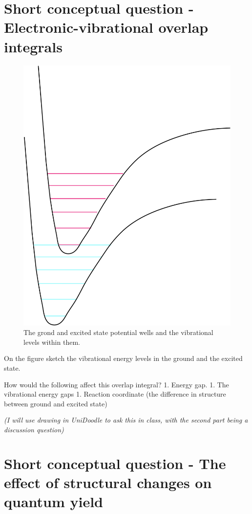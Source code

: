 \documentclass[
]{book}
\begin{document}
\hypertarget{sec:overlap}{%
\section{Short conceptual question - Electronic-vibrational overlap integrals}\label{sec:overlap}}

\begin{figure}

{\centering \includegraphics[width=0.7\linewidth]{images/overlap} 

}

\caption{The grond and excited state potential wells and the vibrational levels within them.}\label{fig:overlap}
\end{figure}

On the figure sketch the vibrational energy levels in the ground and the excited state.

How would the following affect this overlap integral?
1. Energy gap.
1. The vibrational energy gaps
1. Reaction coordinate (the difference in structure between ground and excited state)

\emph{(I will use drawing in UniDoodle to ask this in class, with the second part being a discussion question)}

\hypertarget{sec:structureQY}{%
\section{Short conceptual question - The effect of structural changes on quantum yield}\label{sec:structureQY}}
\end{document}
